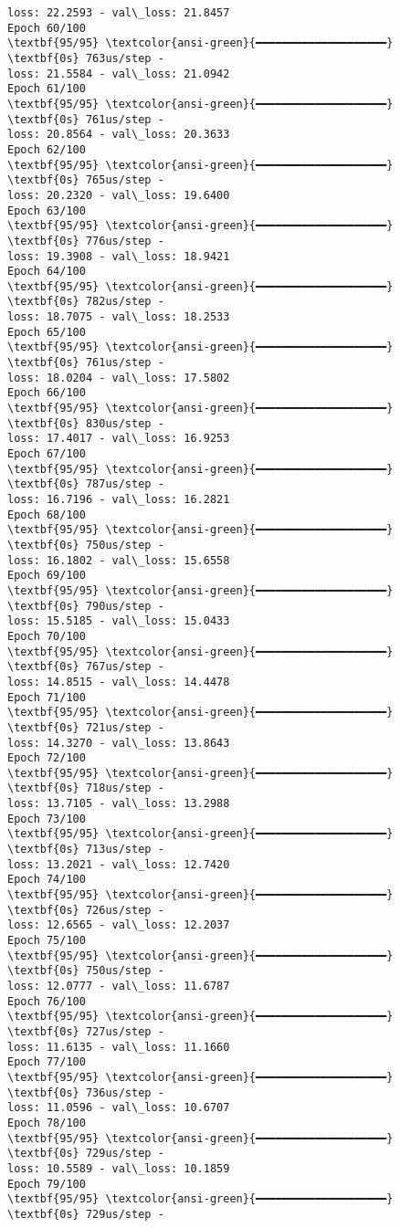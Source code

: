 \documentclass[11pt]{article}
\begin{document}
\begin{Verbatim}[commandchars=\\\{\}]
loss: 22.2593 - val\_loss: 21.8457
Epoch 60/100
\textbf{95/95} \textcolor{ansi-green}{━━━━━━━━━━━━━━━━━━━━} \textbf{0s} 763us/step -
loss: 21.5584 - val\_loss: 21.0942
Epoch 61/100
\textbf{95/95} \textcolor{ansi-green}{━━━━━━━━━━━━━━━━━━━━} \textbf{0s} 761us/step -
loss: 20.8564 - val\_loss: 20.3633
Epoch 62/100
\textbf{95/95} \textcolor{ansi-green}{━━━━━━━━━━━━━━━━━━━━} \textbf{0s} 765us/step -
loss: 20.2320 - val\_loss: 19.6400
Epoch 63/100
\textbf{95/95} \textcolor{ansi-green}{━━━━━━━━━━━━━━━━━━━━} \textbf{0s} 776us/step -
loss: 19.3908 - val\_loss: 18.9421
Epoch 64/100
\textbf{95/95} \textcolor{ansi-green}{━━━━━━━━━━━━━━━━━━━━} \textbf{0s} 782us/step -
loss: 18.7075 - val\_loss: 18.2533
Epoch 65/100
\textbf{95/95} \textcolor{ansi-green}{━━━━━━━━━━━━━━━━━━━━} \textbf{0s} 761us/step -
loss: 18.0204 - val\_loss: 17.5802
Epoch 66/100
\textbf{95/95} \textcolor{ansi-green}{━━━━━━━━━━━━━━━━━━━━} \textbf{0s} 830us/step -
loss: 17.4017 - val\_loss: 16.9253
Epoch 67/100
\textbf{95/95} \textcolor{ansi-green}{━━━━━━━━━━━━━━━━━━━━} \textbf{0s} 787us/step -
loss: 16.7196 - val\_loss: 16.2821
Epoch 68/100
\textbf{95/95} \textcolor{ansi-green}{━━━━━━━━━━━━━━━━━━━━} \textbf{0s} 750us/step -
loss: 16.1802 - val\_loss: 15.6558
Epoch 69/100
\textbf{95/95} \textcolor{ansi-green}{━━━━━━━━━━━━━━━━━━━━} \textbf{0s} 790us/step -
loss: 15.5185 - val\_loss: 15.0433
Epoch 70/100
\textbf{95/95} \textcolor{ansi-green}{━━━━━━━━━━━━━━━━━━━━} \textbf{0s} 767us/step -
loss: 14.8515 - val\_loss: 14.4478
Epoch 71/100
\textbf{95/95} \textcolor{ansi-green}{━━━━━━━━━━━━━━━━━━━━} \textbf{0s} 721us/step -
loss: 14.3270 - val\_loss: 13.8643
Epoch 72/100
\textbf{95/95} \textcolor{ansi-green}{━━━━━━━━━━━━━━━━━━━━} \textbf{0s} 718us/step -
loss: 13.7105 - val\_loss: 13.2988
Epoch 73/100
\textbf{95/95} \textcolor{ansi-green}{━━━━━━━━━━━━━━━━━━━━} \textbf{0s} 713us/step -
loss: 13.2021 - val\_loss: 12.7420
Epoch 74/100
\textbf{95/95} \textcolor{ansi-green}{━━━━━━━━━━━━━━━━━━━━} \textbf{0s} 726us/step -
loss: 12.6565 - val\_loss: 12.2037
Epoch 75/100
\textbf{95/95} \textcolor{ansi-green}{━━━━━━━━━━━━━━━━━━━━} \textbf{0s} 750us/step -
loss: 12.0777 - val\_loss: 11.6787
Epoch 76/100
\textbf{95/95} \textcolor{ansi-green}{━━━━━━━━━━━━━━━━━━━━} \textbf{0s} 727us/step -
loss: 11.6135 - val\_loss: 11.1660
Epoch 77/100
\textbf{95/95} \textcolor{ansi-green}{━━━━━━━━━━━━━━━━━━━━} \textbf{0s} 736us/step -
loss: 11.0596 - val\_loss: 10.6707
Epoch 78/100
\textbf{95/95} \textcolor{ansi-green}{━━━━━━━━━━━━━━━━━━━━} \textbf{0s} 729us/step -
loss: 10.5589 - val\_loss: 10.1859
Epoch 79/100
\textbf{95/95} \textcolor{ansi-green}{━━━━━━━━━━━━━━━━━━━━} \textbf{0s} 729us/step -

\end{Verbatim}
\end{document}
